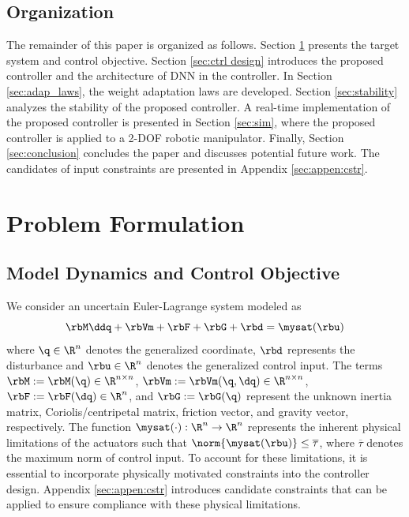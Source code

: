 \documentclass[lettersize,journal]{IEEEtran}
\begin{document}
\subsection{Organization}


The remainder of this paper is organized as follows. 
Section \ref{sec:Problem Formulation} presents the target system and control objective.
Section \ref{sec:ctrl design} introduces the proposed controller and the architecture of DNN in the controller. 
In Section \ref{sec:adap_laws}, the weight adaptation laws are developed.
Section \ref{sec:stability} analyzes the stability of the proposed controller.
A real-time implementation of the proposed controller is presented in Section \ref{sec:sim}, where the proposed controller is applied to a 2-DOF robotic manipulator.
Finally, Section \ref{sec:conclusion} concludes the paper and discusses potential future work.
The candidates of input constraints are presented in Appendix \ref{sec:appen:cstr}.

\section{Problem Formulation}\label{sec:Problem Formulation}

\subsection{Model Dynamics and Control Objective}

We consider an uncertain Euler-Lagrange system modeled as
\begin{equation}
    \rbM\ddq + \rbVm + \rbF + \rbG + \rbd
    =
    \mysat(\rbu)
    \label{eq:sys1}
\end{equation}
where $\q\in \R^n$ denotes the generalized coordinate, $\rbd$ represents the disturbance and $\rbu\in\R^n$ denotes the generalized control input. 
The terms $\rbM:=\rbM(\q)\in\R^{n\times n}$, $\rbVm:=\rbVm(\q,\dq)\in\R^{n\times n}$, $\rbF:=\rbF(\dq)\in\R^{n}$, and $\rbG:=\rbG(\q)$ represent the unknown inertia matrix, Coriolis/centripetal matrix, friction vector, and gravity vector, respectively.
The function $\mysat(\cdot):\R^n\to\R^n$ represents the inherent physical limitations of the actuators such that $\norm{\mysat(\rbu)}\le \overline\tau$, where $\overline\tau$ denotes the maximum norm of control input.
To account for these limitations, it is essential to incorporate physically motivated constraints into the controller design.
Appendix \ref{sec:appen:cstr} introduces candidate constraints that can be applied to ensure compliance with these physical limitations.
\end{document}
